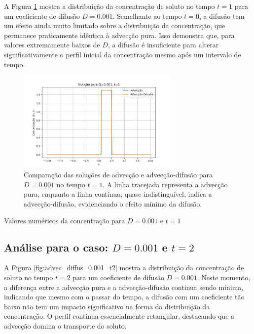 A Figura \ref{fig:advec_diffus_0.001_t1} mostra a distribuição da concentração de soluto no tempo \( t = 1 \) para um coeficiente de difusão \( D = 0.001 \). Semelhante ao tempo \( t = 0 \), a difusão tem um efeito ainda muito limitado sobre a distribuição da concentração, que permanece praticamente idêntica à advecção pura. Isso demonstra que, para valores extremamente baixos de \( D \), a difusão é insuficiente para alterar significativamente o perfil inicial da concentração mesmo após um intervalo de tempo.

\begin{figure}[H]
    \centering
    \includegraphics[width=0.7\textwidth]{code/plot/Advec_Difus_t1_D0.001.png}
    \caption{Comparação das soluções de advecção e advecção-difusão para \( D = 0.001 \) no tempo \( t = 1 \). A linha tracejada representa a advecção pura, enquanto a linha contínua, quase indistinguível, indica a advecção-difusão, evidenciando o efeito mínimo da difusão.}
    \label{fig:advec_diffus_0.001_t1}
\end{figure}

\begin{table}[H]
    \centering
    \caption{Valores numéricos da concentração para \( D = 0.001 \) e \( t = 1 \)}
    
\end{table}


\subsection*{Análise para o caso: \( D = 0.001 \) e \( t = 2 \)}

A Figura \ref{fig:advec_diffus_0.001_t2} mostra a distribuição da concentração de soluto no tempo \( t = 2 \) para um coeficiente de difusão \( D = 0.001 \). Neste momento, a diferença entre a advecção pura e a advecção-difusão continua sendo mínima, indicando que mesmo com o passar do tempo, a difusão com um coeficiente tão baixo não tem um impacto significativo na forma da distribuição da concentração. O perfil continua essencialmente retangular, destacando que a advecção domina o transporte do soluto.

